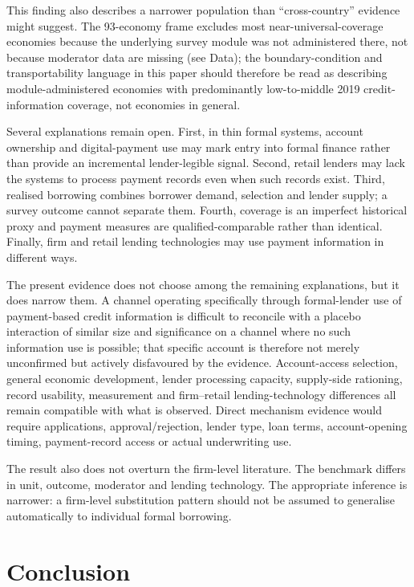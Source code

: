 This finding also describes a narrower population than ``cross-country'' evidence might
suggest. The 93-economy frame excludes most near-universal-coverage economies because the
underlying survey module was not administered there, not because moderator data are
missing (see Data); the boundary-condition and transportability language in this paper
should therefore be read as describing module-administered economies with predominantly
low-to-middle 2019 credit-information coverage, not economies in general.

Several explanations remain open. First, in thin formal systems, account ownership and
digital-payment use may mark entry into formal finance rather than provide an incremental
lender-legible signal. Second, retail lenders may lack the systems to process payment
records even when such records exist. Third, realised borrowing combines borrower demand,
selection and lender supply; a survey outcome cannot separate them. Fourth, coverage is an
imperfect historical proxy and payment measures are qualified-comparable rather than
identical. Finally, firm and retail lending technologies may use payment information in
different ways.

The present evidence does not choose among the remaining explanations, but it does narrow
them. A channel operating specifically through formal-lender use of payment-based credit
information is difficult to reconcile with a placebo interaction of similar size and
significance on a channel where no such information use is possible; that specific
account is therefore not merely unconfirmed but actively disfavoured by the evidence.
Account-access selection, general economic development, lender processing capacity,
supply-side rationing, record usability, measurement and firm--retail lending-technology
differences all remain compatible with what is observed. Direct mechanism evidence would
require applications, approval/rejection, lender type, loan terms, account-opening timing,
payment-record access or actual underwriting use.

The result also does not overturn the firm-level literature. The benchmark differs in unit,
outcome, moderator and lending technology. The appropriate inference is narrower: a
firm-level substitution pattern should not be assumed to generalise automatically to
individual formal borrowing.

\section{Conclusion}

